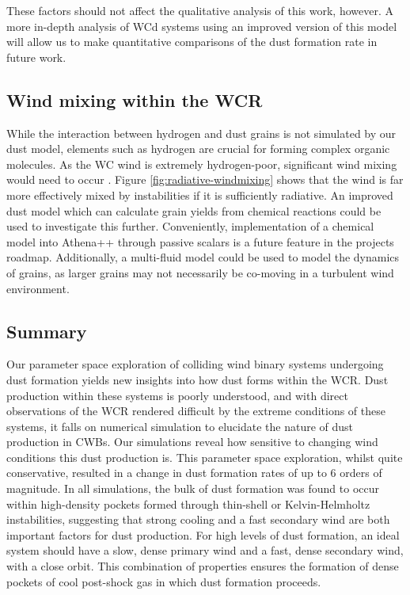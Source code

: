 \noindent
These factors should not affect the qualitative analysis of this work, however.
A more in-depth analysis of WCd systems using an improved version of this model will allow us to make quantitative comparisons of the dust formation rate in future work.

\subsection{Wind mixing within the WCR}

While the interaction between hydrogen and dust grains is not simulated by our dust model, elements such as hydrogen are crucial for forming complex organic molecules.
As the WC wind is extremely hydrogen-poor, significant wind mixing would need to occur
\parencite{herbstComplexOrganicInterstellar2009}.
Figure \ref{fig:radiative-windmixing} shows that the wind is far more effectively mixed by instabilities if it is sufficiently radiative.
An improved dust model which can calculate grain yields from chemical reactions could be used to investigate this further.
Conveniently, implementation of a chemical model into Athena++ through passive scalars is a future feature in the projects roadmap.
Additionally, a multi-fluid model could be used to model the dynamics of grains, as larger grains may not necessarily be co-moving in a turbulent wind environment.

\subsection{Summary}

Our parameter space exploration of colliding wind binary systems undergoing dust formation yields new insights into how dust forms within the WCR.
Dust production within these systems is poorly understood, and with direct observations of the WCR rendered difficult by the extreme conditions of these systems, it falls on numerical simulation to elucidate the nature of dust production in CWBs.
Our simulations reveal how sensitive to changing wind conditions this dust production is.
This parameter space exploration, whilst quite conservative, resulted in a change in dust formation rates of up to 6 orders of magnitude.
In all simulations, the bulk of dust formation was found to occur within high-density pockets formed through thin-shell or Kelvin-Helmholtz instabilities, suggesting that strong cooling and a fast secondary wind are both important factors for dust production.
For high levels of dust formation, an ideal system should have a slow, dense primary wind and a fast, dense secondary wind, with a close orbit.
This combination of properties ensures the formation of dense pockets of cool post-shock gas in which dust formation proceeds.

